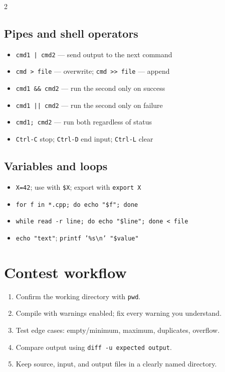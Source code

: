 \documentclass[10pt]{article}
\newcommand{\cmd}[1]{\texttt{\small #1}}
\begin{document}
\begin{multicols}{2}
\subsection{Pipes and shell operators}
\begin{itemize}
  \item \cmd{cmd1 | cmd2} --- send output to the next command
  \item \cmd{cmd > file} --- overwrite; \cmd{cmd >> file} --- append
  \item \cmd{cmd1 \&\& cmd2} --- run the second only on success
  \item \cmd{cmd1 || cmd2} --- run the second only on failure
  \item \cmd{cmd1; cmd2} --- run both regardless of status
  \item \cmd{Ctrl-C} stop; \cmd{Ctrl-D} end input; \cmd{Ctrl-L} clear
\end{itemize}

\subsection{Variables and loops}
\begin{itemize}
  \item \cmd{X=42}; use with \cmd{\$X}; export with \cmd{export X}
  \item \cmd{for f in *.cpp; do echo "\$f"; done}
  \item \cmd{while read -r line; do echo "\$line"; done < file}
  \item \cmd{echo "text"}; \cmd{printf '\%s\textbackslash n' "\$value"}
\end{itemize}

\section{Contest workflow}
\begin{enumerate}
  \item Confirm the working directory with \cmd{pwd}.
  \item Compile with warnings enabled; fix every warning you understand.
  \item Test edge cases: empty/minimum, maximum, duplicates, overflow.
  \item Compare output using \cmd{diff -u expected output}.
  \item Keep source, input, and output files in a clearly named directory.
\end{enumerate}


\end{multicols}
\end{document}
